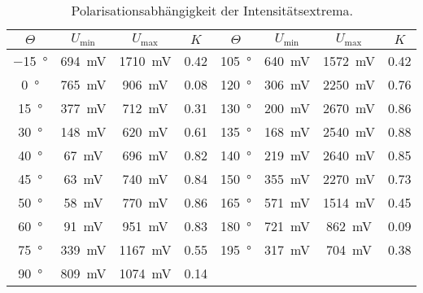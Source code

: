 \begin{table}
  \centering
  \caption{Polarisationsabhängigkeit der Intensitätsextrema.}
  \label{tabular_01}
  \begin{tabular}{c c c c | c c c c}
    \toprule
   \multicolumn{1}{c}{$\Theta$} & \multicolumn{1}{c}{$U_\text{min}$} & \multicolumn{1}{c}{$U_\text{max}$}
    & \multicolumn{1}{c}{$K$} & \multicolumn{1}{c}{$\Theta$} & \multicolumn{1}{c}{$U_\text{min}$}
    & \multicolumn{1}{c}{$U_\text{max}$} & \multicolumn{1}{c}{$K$}\\
   \midrule
   \SI{-15}{\degree} & \SI{694}{\milli\volt} & \SI{1710}{\milli\volt} &  {0.42} & \SI{105}{\degree} & \SI{640}{\milli\volt} & \SI{1572}{\milli\volt} &  {0.42} \\
   \SI{0  }{\degree} & \SI{765}{\milli\volt} & \SI{906 }{\milli\volt} &  {0.08} & \SI{120}{\degree} & \SI{306}{\milli\volt} & \SI{2250}{\milli\volt} &  {0.76} \\
   \SI{15 }{\degree} & \SI{377}{\milli\volt} & \SI{712 }{\milli\volt} &  {0.31} & \SI{130}{\degree} & \SI{200}{\milli\volt} & \SI{2670}{\milli\volt} &  {0.86} \\
   \SI{30 }{\degree} & \SI{148}{\milli\volt} & \SI{620 }{\milli\volt} &  {0.61} & \SI{135}{\degree} & \SI{168}{\milli\volt} & \SI{2540}{\milli\volt} &  {0.88} \\
   \SI{40 }{\degree} & \SI{67 }{\milli\volt} & \SI{696 }{\milli\volt} &  {0.82} & \SI{140}{\degree} & \SI{219}{\milli\volt} & \SI{2640}{\milli\volt} &  {0.85} \\
   \SI{45 }{\degree} & \SI{63 }{\milli\volt} & \SI{740 }{\milli\volt} &  {0.84} & \SI{150}{\degree} & \SI{355}{\milli\volt} & \SI{2270}{\milli\volt} &  {0.73} \\
   \SI{50 }{\degree} & \SI{58 }{\milli\volt} & \SI{770 }{\milli\volt} &  {0.86} & \SI{165}{\degree} & \SI{571}{\milli\volt} & \SI{1514}{\milli\volt} &  {0.45} \\
   \SI{60 }{\degree} & \SI{91 }{\milli\volt} & \SI{951 }{\milli\volt} &  {0.83} & \SI{180}{\degree} & \SI{721}{\milli\volt} & \SI{862 }{\milli\volt} &  {0.09} \\
   \SI{75 }{\degree} & \SI{339}{\milli\volt} & \SI{1167}{\milli\volt} &  {0.55} & \SI{195}{\degree} & \SI{317}{\milli\volt} & \SI{704 }{\milli\volt} &  {0.38} \\
   \SI{90 }{\degree} & \SI{809}{\milli\volt} & \SI{1074}{\milli\volt} &  {0.14} \\
\bottomrule
  \end{tabular}
\end{table}
